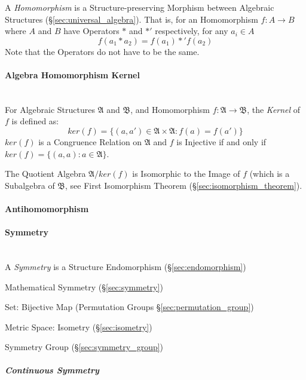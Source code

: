 A \emph{Homomorphism} is a Structure-preserving Morphism between
Algebraic Structures (\S\ref{sec:universal_algebra}). That is, for
an Homomorphism $f : A \rightarrow B$ where $A$ and $B$ have Operators
$*$ and $*'$ respectively, for any $a_i \in A$
\[
  f(a_1 * a_2) = f(a_1) *' f(a_2)
\]
\HandRight\;Note that the Operators do not have to be the same.



\paragraph{Algebra Homomorphism Kernel}
\label{sec:algebra_homomorphism_kernel} \hfill \\

For Algebraic Structures $\mathfrak{A}$ and $\mathfrak{B}$, and
Homomorphism $f: \mathfrak{A} \rightarrow \mathfrak{B}$, the
\emph{Kernel} of $f$ is defined as:
\[
    ker(f) = \{ (a,a') \in \mathfrak{A} \times \mathfrak{A} : f(a) = f(a') \}
\]
$ker(f)$ is a Congruence Relation on $\mathfrak{A}$ and $f$ is Injective if and
only if $ker(f) = \{(a,a) : a \in \mathfrak{A}\}$.

The Quotient Algebra $\mathfrak{A}/ker(f)$ is Isomorphic to the Image
of $f$ (which is a Subalgebra of $\mathfrak{B}$, see First Isomorphism
Theorem (\S\ref{sec:isomorphism_theorem}).



\paragraph{Antihomomorphism}\label{sec:antihomomorphism}

\paragraph{Symmetry}\label{sec:structure_symmetry}
\hfill \\

A \emph{Symmetry} is a Structure Endomorphism
(\S\ref{sec:endomorphism})

Mathematical Symmetry (\S\ref{sec:symmetry})

Set: Bijective Map (Permutation Groups \S\ref{sec:permutation_group})

Metric Space: Isometry (\S\ref{sec:isometry})

Symmetry Group (\S\ref{sec:symmetry_group})



\subparagraph{Continuous Symmetry}\label{sec:continuous_symmetry}
\hfill \\

